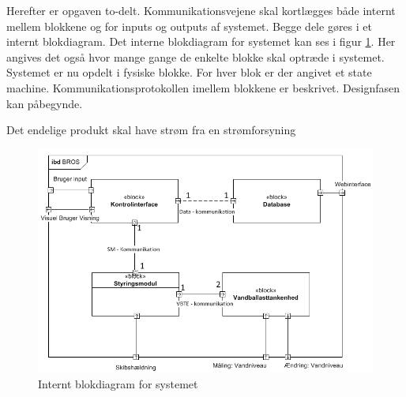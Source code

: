 Herefter er opgaven to-delt. Kommunikationsvejene skal kortlægges både internt mellem blokkene og for inputs og outputs af systemet. Begge dele gøres i et internt blokdiagram. Det interne blokdiagram for systemet kan ses i figur \ref{fig:idb_bros}. Her angives det også hvor mange gange de enkelte blokke skal optræde i systemet.\\

Systemet er nu opdelt i fysiske blokke. For hver blok er der angivet et state machine. Kommunikationsprotokollen imellem blokkene er beskrivet. Designfasen kan påbegynde.

Det endelige produkt skal have strøm fra en strømforsyning \fxnote{}

\begin{figure}[htbp]
\centering
\includegraphics[scale=0.8]{billeder/Systemarkitektur/ibd_bros}
\caption{Internt blokdiagram for systemet}
\label{fig:idb_bros}
\end{figure}

